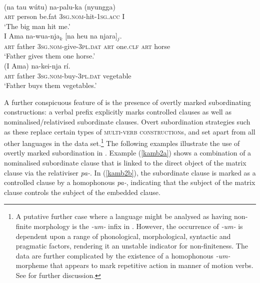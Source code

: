 \ea 
{}\\
\ea \label{kamb1a}
\gll (na tau wútu) na-palu-ka (nyungga) \\
\textsc{art} person be.fat \textsc{3}\textsc{sg}.\textsc{nom}-hit-\textsc{1}\textsc{sg}.\textsc{acc} I \\
\glft `The big man hit me.' \\ 
\ex \label{kamb1b}
\gll I Ama na-wua-nja$_k$ [na heu na njara]$_j$. \\
\textsc{art} father \textsc{3}\textsc{sg}.\textsc{nom}-give-\textsc{3}\textsc{pl}.\textsc{dat} \textsc{art} one.\textsc{clf} \textsc{art} horse \\
\glft `Father gives them one horse.' \\ 
\ex \label{kamb1c}
\gll (I Ama) na-kei-nja rí. \\ 
\textsc{art} father \textsc{3}\textsc{sg}.\textsc{nom}-buy-\textsc{3}\textsc{pl}.\textsc{dat} vegetable \\
\glft `Father buys them vegetables.'\\ 
\z
\z

\largerpage[-1]
A further conspicuous feature of  is the presence of overtly marked subordinating constructions: a verbal prefix explicitly marks controlled clauses as well as nominalised/relativised subordinate clauses. Overt subordination strat\-e\-gies such as these replace certain types of \textsc{multi-verb construction}s, and set  apart from all other languages in the data set.\footnote{A putative further case where a language might be analysed as having non-finite morphology is the \textit{-um-} infix in . However, the occurrence of \textit{-um-} is dependent upon a range of phonological, morphological, syntactic and pragmatic factors, rendering it an unstable indicator for non-finiteness. The data are further complicated by the existence of a homophonous \textit{-um-} morpheme that appears to mark repetitive action in manner of motion verbs. See \citet[117]{mead2008verb} for further discussion.} The following examples illustrate the use of overtly marked subordination in . Example (\ref{kamb2a}) shows a combination of a nominalised subordinate clause that is linked to the direct object of the matrix clause via the relativiser \textit{pa-}. In (\ref{kamb2b}), the subordinate clause is marked as a controlled clause by a homophonous \textit{pa-}, indicating that the subject of the matrix clause controls the subject of the embedded clause.

